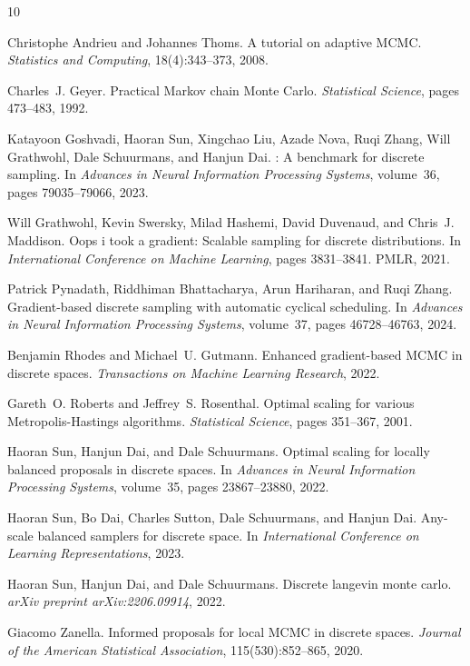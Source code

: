 \documentclass{article}
\begin{document}

\begin{thebibliography}{10}

Christophe Andrieu and Johannes Thoms.
\newblock A tutorial on adaptive {MCMC}.
\newblock \emph{Statistics and Computing}, 18(4):343--373, 2008.

Charles~J. Geyer.
\newblock Practical {M}arkov chain {M}onte {C}arlo.
\newblock \emph{Statistical Science}, pages 473--483, 1992.

Katayoon Goshvadi, Haoran Sun, Xingchao Liu, Azade Nova, Ruqi Zhang, Will Grathwohl, Dale Schuurmans, and Hanjun Dai.
: A benchmark for discrete sampling.
\newblock In \emph{Advances in Neural Information Processing Systems}, volume~36, pages 79035--79066, 2023.

Will Grathwohl, Kevin Swersky, Milad Hashemi, David Duvenaud, and Chris~J. Maddison.
\newblock Oops i took a gradient: Scalable sampling for discrete distributions.
\newblock In \emph{International Conference on Machine Learning}, pages 3831--3841. PMLR, 2021.

Patrick Pynadath, Riddhiman Bhattacharya, Arun Hariharan, and Ruqi Zhang.
\newblock Gradient-based discrete sampling with automatic cyclical scheduling.
\newblock In \emph{Advances in Neural Information Processing Systems}, volume~37, pages 46728--46763, 2024.

Benjamin Rhodes and Michael~U. Gutmann.
\newblock Enhanced gradient-based {MCMC} in discrete spaces.
\newblock \emph{Transactions on Machine Learning Research}, 2022.

Gareth~O. Roberts and Jeffrey~S. Rosenthal.
\newblock Optimal scaling for various {M}etropolis-{H}astings algorithms.
\newblock \emph{Statistical Science}, pages 351--367, 2001.

Haoran Sun, Hanjun Dai, and Dale Schuurmans.
\newblock Optimal scaling for locally balanced proposals in discrete spaces.
\newblock In \emph{Advances in Neural Information Processing Systems}, volume~35, pages 23867--23880, 2022.

Haoran Sun, Bo Dai, Charles Sutton, Dale Schuurmans, and Hanjun Dai.
\newblock Any-scale balanced samplers for discrete space.
\newblock In \emph{International Conference on Learning Representations}, 2023.

Haoran Sun, Hanjun Dai, and Dale Schuurmans.
\newblock Discrete langevin monte carlo.
\newblock \emph{arXiv preprint arXiv:2206.09914}, 2022.

Giacomo Zanella.
\newblock Informed proposals for local {MCMC} in discrete spaces.
\newblock \emph{Journal of the American Statistical Association}, 115(530):852--865, 2020.

\end{thebibliography}
\end{document}
